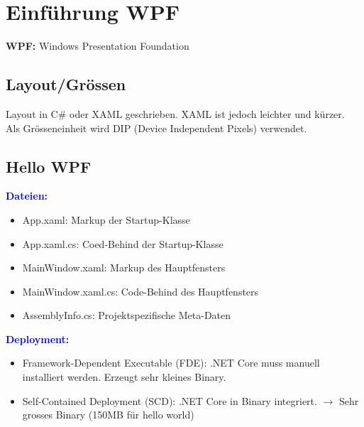 
\section{Einführung WPF}
\textbf{WPF:} Windows Presentation Foundation
\subsection{Layout/Grössen}
Layout in C\# oder XAML geschrieben. XAML ist jedoch leichter und kürzer.\\
Als Grösseneinheit wird DIP (Device Independent Pixels) verwendet.
\subsection{Hello WPF}
\textbf{\textcolor{blue}{Dateien:}}
\begin{itemize}[topsep=0pt, leftmargin=4mm]
    \setlength\itemsep{-0.3em}
    \item App.xaml: Markup der Startup-Klasse
    \item App.xaml.cs: Coed-Behind der Startup-Klasse
    \item MainWindow.xaml: Markup des Hauptfensters
    \item MainWindow.xaml.cs: Code-Behind des Hauptfensters
    \item AssemblyInfo.cs: Projektspezifische Meta-Daten
\end{itemize}
\textbf{\textcolor{blue}{Deployment:}}
\begin{itemize}[topsep=0pt, leftmargin=4mm]
    \setlength\itemsep{-0.3em}
    \item Framework-Dependent Executable (FDE): .NET Core muss manuell installiert werden. Erzeugt sehr kleines Binary.
    \item Self-Contained Deployment (SCD): .NET Core in Binary integriert. $\rightarrow$ Sehr grosses Binary (150MB für hello world)
\end{itemize}